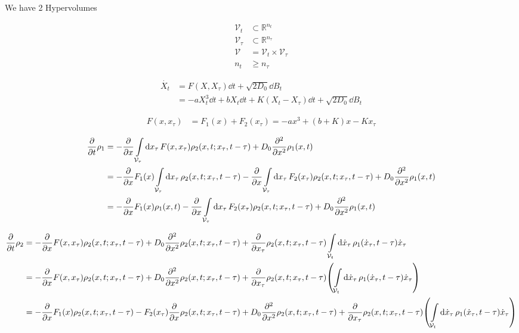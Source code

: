 \documentclass[a4paper,10pt]{article}
\newcommand{\intl}{\int\limits}
\begin{document}
We have 2 Hypervolumes

\begin{align}
	\mathcal{V}_t
	&\subset
	\mathbb{R}^{n_t}
\\
	\mathcal{V}_\tau
	&\subset
	\mathbb{R}^{n_\tau}
\\
	\mathcal{V}
	&=
	\mathcal{V}_t
	\times
	\mathcal{V}_\tau
\\
	n_t
	&\geq
	n_\tau
\end{align}


\begin{align}
	\dot{X_t}
	&=
	F(X,X_\tau)
	\dd{t}
	+
	\sqrt{2D_0}
	\dd{B}_t
\\	
	&=
	-
	a
	X_t^3
	\dd{t}
	+
	b
	X_t
	\dd{t}
	+
	K
	(X_t-X_\tau)
	\dd{t}
	+
	\sqrt{2D_0}
	\dd{B}_t
\end{align}

\begin{align}
	F(x,x_\tau)
	&=
	F_1(x)
	+
	F_2(x_\tau)
	=
	-
	ax^3
	+
	(b+K)x
	-
	Kx_\tau
\end{align}

\begin{align}
	\pdv{t}
	\rho_1
	&=
	-
	\pdv{x}
	\intl_{\mathcal{V}_\tau}
	\dd{x_\tau}
	F(x,x_\tau)
	\rho_2
	(x,t;x_\tau,t-\tau)
	+
	D_0
	\pdv[2]{x}
	\rho_1(x,t)
\\
	&=
	-
	\pdv{x}
	F_1(x)
	\intl_{\mathcal{V}_\tau}
	\dd{x_\tau}
	\rho_2
	(x,t;x_\tau,t-\tau)
	-
	\pdv{x}
	\intl_{\mathcal{V}_\tau}
	\dd{x_\tau}
	F_2(x_\tau)
	\rho_2
	(x,t;x_\tau,t-\tau)	
	+
	D_0
	\pdv[2]{x}
	\rho_1(x,t)
\\
	&=
	-
	\pdv{x}
	F_1(x)
	\rho_1
	(x,t)
	-
	\pdv{x}
	\intl_{\mathcal{V}_\tau}
	\dd{x_\tau}
	F_2(x_\tau)
	\rho_2
	(x,t;x_\tau,t-\tau)	
	+
	D_0
	\pdv[2]{x}
	\rho_1(x,t)
\end{align}

\begin{align}
	\pdv{t}
	\rho_2
	&=
	-
	\pdv{x}
	F(x,x_\tau)
	\rho_2
	(x,t;x_\tau,t-\tau)
	+
	D_0
	\pdv[2]{x}
	\rho_2
	(x,t;x_\tau,t-\tau)
	+
	\pdv{x_\tau}
	\rho_2
	(x,t;x_\tau,t-\tau)
	\intl_{\mathcal{V}_t}
	\dd{\dot{x}_\tau}
	\rho_1
	(\dot{x}_\tau,t-\tau)
	\dot{x}_\tau
\\
	&=
	-
	\pdv{x}
	F(x,x_\tau)
	\rho_2
	(x,t;x_\tau,t-\tau)
	+
	D_0
	\pdv[2]{x}
	\rho_2
	(x,t;x_\tau,t-\tau)
	+
	\pdv{x_\tau}
	\rho_2
	(x,t;x_\tau,t-\tau)
	\pqty{
		\intl_{\mathcal{V}_t}
		\dd{\dot{x}_\tau}
		\rho_1
		(\dot{x}_\tau,t-\tau)
		\dot{x}_\tau
	}
\\
	&=
	-
	\pdv{x}
	F_1(x)
	\rho_2
	(x,t;x_\tau,t-\tau)
	-
	F_2(x_\tau)
	\pdv{x}
	\rho_2
	(x,t;x_\tau,t-\tau)
	+
	D_0
	\pdv[2]{x}
	\rho_2
	(x,t;x_\tau,t-\tau)
	+
	\pdv{x_\tau}
	\rho_2
	(x,t;x_\tau,t-\tau)
	\pqty{
		\intl_{\mathcal{V}_t}
		\dd{\dot{x}_\tau}
		\rho_1
		(\dot{x}_\tau,t-\tau)
		\dot{x}_\tau
	}
\end{align}
\end{document}
